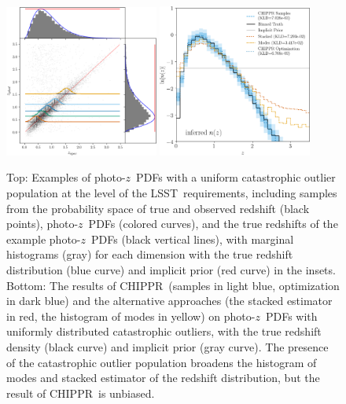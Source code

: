 \documentclass[iop]{emulateapj}
\newcommand{\project}[1]{{\textsc{#1}}}
\newcommand{\lsst}{\project{LSST}}
\newcommand{\Chippr}{\project{CHIPPR}}
\newcommand{\pz}{photo-$z$~}
\newcommand{\pzpdf}{\pz PDF}
\begin{document}
\begin{figure}
	\begin{center}
	\includegraphics[width=0.45\textwidth]{figures/chippr/single_uout_mega_scatter.png}
	\includegraphics[width=0.45\textwidth]{figures/chippr/single_uout_log_estimators.png}
	\caption{
		Top: Examples of \pzpdf s with a uniform catastrophic outlier population at the level of the \lsst\ requirements, including samples from the probability space of true and observed redshift (black points), \pzpdf s (colored curves), and the true redshifts of the example \pzpdf s (black vertical lines), with marginal histograms (gray) for each dimension with the true redshift distribution (blue curve) and implicit prior (red curve) in the insets.
		Bottom: The results of \Chippr\ (samples in light blue, optimization in dark blue) and the alternative approaches (the stacked estimator in red, the histogram of modes in yellow) on \pzpdf s with uniformly distributed catastrophic outliers, with the true redshift density (black curve) and implicit prior (gray curve).
		The presence of the catastrophic outlier population broadens the histogram of modes and stacked estimator of the redshift distribution, but the result of \Chippr\ is unbiased.
	}
	\label{fig:uniform-outliers}
	\end{center}
\end{figure}
\end{document}
